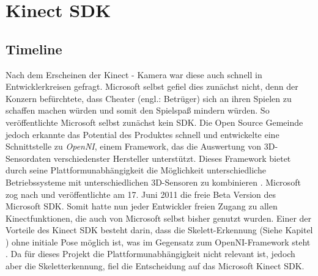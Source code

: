 \section{Kinect SDK}\label{SDK}
%
%
%
%
%
%

	
\subsection{Timeline}
Nach dem Erscheinen der Kinect - Kamera war diese auch schnell in Entwicklerkreisen gefragt. Microsoft selbst gefiel dies zunächst nicht, denn der Konzern befürchtete, dass Cheater (engl.: Betrüger) sich an ihren Spielen zu schaffen machen würden und somit den Spielspaß mindern würden. So veröffentlichte Microsoft selbst zunächst kein SDK. Die Open Source Gemeinde jedoch erkannte das Potential des Produktes schnell und entwickelte eine Schnittstelle zu \textit{OpenNI}, einem Framework, das die Auswertung von 3D-Sensordaten verschiedenster Hersteller unterstützt. Dieses Framework bietet durch seine Plattformunabhängigkeit die Möglichkeit unterschiedliche Betriebssysteme mit unterschiedlichen 3D-Sensoren zu kombinieren \cite{webb2012beginning}.
Microsoft zog nach und veröffentlichte am 17. Juni 2011 die freie Beta Version des Microsoft SDK. Somit hatte nun jeder Entwickler freien Zugang zu allen Kinectfunktionen, die auch von Microsoft selbst bisher genutzt wurden. Einer der Vorteile des Kinect SDK besteht darin, dass die Skelett-Erkennung (Siehe Kapitel ) ohne initiale Pose möglich ist, was im Gegensatz zum OpenNI-Framework steht \cite{webb2012beginning}. Da für dieses Projekt die Plattformunabhängigkeit nicht relevant ist, jedoch aber die Skeletterkennung, fiel die Entscheidung auf das Microsoft Kinect SDK.

